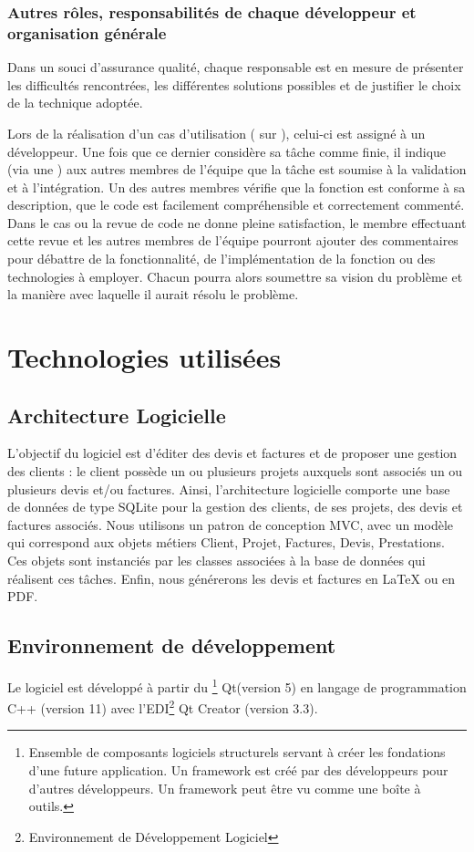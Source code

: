 \subsubsection{Autres rôles, responsabilités de chaque développeur et organisation générale}
Dans un souci d’assurance qualité, chaque responsable est en mesure de présenter les difficultés rencontrées, les différentes
solutions possibles et de justifier le choix de la technique adoptée.

Lors de la réalisation d’un cas d’utilisation ( sur ), celui-ci est assigné à un développeur. Une fois que ce dernier considère sa
tâche comme finie, il indique (via une ) aux autres membres de l’équipe que la tâche est soumise à la validation et à l'intégration.
Un des autres membres vérifie que la fonction est conforme à sa description, que le code est facilement compréhensible et correctement commenté. Dans
le cas ou la revue de code ne donne pleine satisfaction, le membre effectuant cette revue et les autres membres de l’équipe pourront ajouter des
commentaires pour débattre de la fonctionnalité, de l’implémentation de la fonction ou des technologies à employer. Chacun pourra
alors soumettre sa vision du problème et la manière avec laquelle il aurait résolu le problème. 

\section{Technologies utilisées}
\subsection{Architecture Logicielle}
L’objectif du logiciel est d’éditer des devis et factures et de proposer une gestion des clients : le client possède un ou plusieurs projets auxquels sont associés un ou plusieurs devis et/ou factures. 
Ainsi, l’architecture logicielle comporte une base de données de type SQLite pour la gestion des clients, de ses projets, des devis et factures associés. 
Nous utilisons un patron de conception MVC, avec un modèle qui correspond aux objets métiers Client, Projet, Factures, Devis, Prestations. Ces objets sont instanciés par les classes associées à la base de données qui réalisent ces tâches.
Enfin, nous générerons les devis et factures en LaTeX ou en PDF.

\subsection{Environnement de développement}
Le logiciel est développé à partir du 
\footnote{Ensemble de composants logiciels structurels servant à créer les fondations d'une future application. Un framework est créé par des développeurs pour d'autres développeurs. Un framework peut être vu comme une boîte à outils.} 
Qt(version 5)
en langage de programmation C++ (version 11) avec l'EDI\footnote{Environnement de Développement Logiciel} Qt Creator (version 3.3). 

